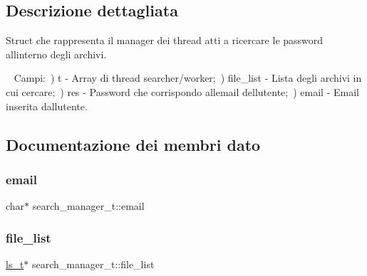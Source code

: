 \subsection{Descrizione dettagliata}
Struct che rappresenta il manager dei thread atti a ricercare le password all\textquotesingle{}interno degli archivi. 

~\newline
Campi\+:~) t -\/ Array di thread searcher/worker;~) file\+\_\+list -\/ Lista degli archivi in cui cercare;~) res -\/ Password che corrispondo all\textquotesingle{}email dell\textquotesingle{}utente;~) email -\/ Email inserita dall\textquotesingle{}utente. 

\subsection{Documentazione dei membri dato}
\mbox{\label{structsearch__manager__t_ad36bf1b5a95e84275ae96e106fc88b6c}} 
\subsubsection{\texorpdfstring{email}{email}}
{\footnotesize\ttfamily char$\ast$ search\+\_\+manager\+\_\+t\+::email}

\mbox{\label{structsearch__manager__t_a7f1f64c246b3827f179dd96c678722cf}} 
\subsubsection{\texorpdfstring{file\+\_\+list}{file\_list}}
{\footnotesize\ttfamily \hyperlink{structls__t}{ls\+\_\+t}$\ast$ search\+\_\+manager\+\_\+t\+::file\+\_\+list}

\mbox{\label{structsearch__manager__t_ae71a7eb74a2af2e9f3ea2ab7de643139}} 
